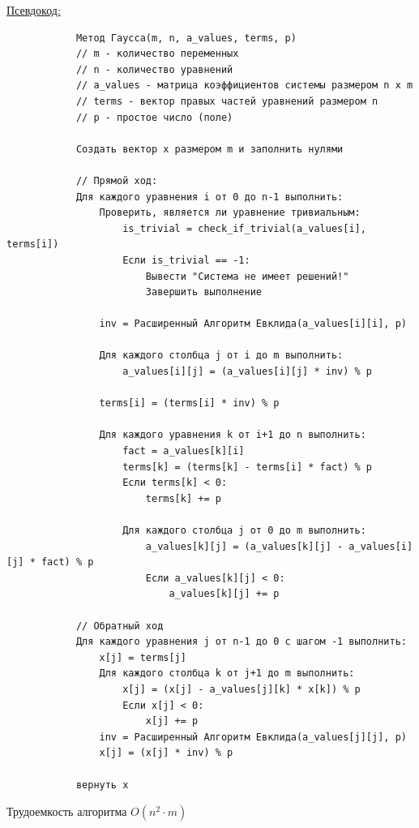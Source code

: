 \documentclass[bachelor, och, labwork]{shiza}
\begin{document}
            \underline{Псевдокод:}
            \begin{verbatim}
            Метод Гаусса(m, n, a_values, terms, p)
            // m - количество переменных
            // n - количество уравнений
            // a_values - матрица коэффициентов системы размером n x m
            // terms - вектор правых частей уравнений размером n
            // p - простое число (поле)

            Создать вектор x размером m и заполнить нулями

            // Прямой ход:
            Для каждого уравнения i от 0 до n-1 выполнить:
                Проверить, является ли уравнение тривиальным:
                    is_trivial = check_if_trivial(a_values[i], terms[i])
                    Если is_trivial == -1:
                        Вывести "Система не имеет решений!"
                        Завершить выполнение
            
                inv = Расширенный Алгоритм Евклида(a_values[i][i], p)

                Для каждого столбца j от i до m выполнить:
                    a_values[i][j] = (a_values[i][j] * inv) % p

                terms[i] = (terms[i] * inv) % p

                Для каждого уравнения k от i+1 до n выполнить:
                    fact = a_values[k][i]
                    terms[k] = (terms[k] - terms[i] * fact) % p
                    Если terms[k] < 0:
                        terms[k] += p

                    Для каждого столбца j от 0 до m выполнить:
                        a_values[k][j] = (a_values[k][j] - a_values[i][j] * fact) % p
                        Если a_values[k][j] < 0:
                            a_values[k][j] += p

            // Обратный ход
            Для каждого уравнения j от n-1 до 0 с шагом -1 выполнить:
                x[j] = terms[j]
                Для каждого столбца k от j+1 до m выполнить:
                    x[j] = (x[j] - a_values[j][k] * x[k]) % p
                    Если x[j] < 0:
                        x[j] += p
                inv = Расширенный Алгоритм Евклида(a_values[j][j], p)
                x[j] = (x[j] * inv) % p
            
            вернуть x
            \end{verbatim}

            Трудоемкость алгоритма $O(n^2 \cdot m)$\\
    
\end{document}
